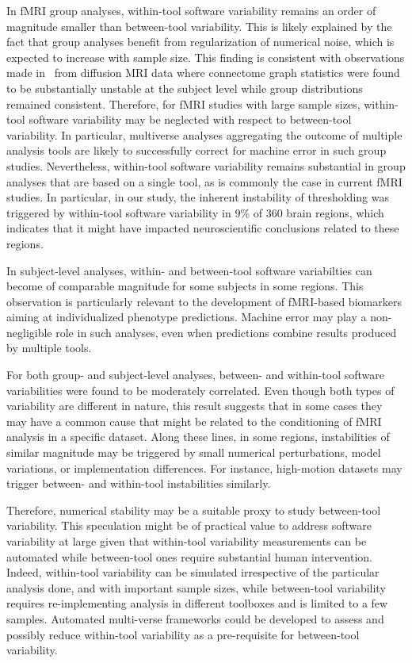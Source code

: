 \documentclass[11pt,onecolumn]{article}
\begin{document}
In fMRI group analyses, within-tool software variability remains an order
of magnitude smaller than between-tool variability. This is likely
explained by the fact that group analyses benefit from regularization of
numerical noise, which is expected to increase with sample size. This finding is
consistent with observations made in~\cite{kiar2020numerical} from
diffusion MRI data where connectome graph statistics were found to be
substantially unstable at the subject level while group distributions
remained consistent. Therefore,
for fMRI studies with large sample sizes, within-tool software variability
may be neglected with respect to between-tool variability. In particular,
multiverse analyses aggregating the outcome of multiple analysis tools are
likely to successfully correct for machine error in such group studies.  Nevertheless, within-tool software variability remains
substantial in group analyses that are based on a single tool, as is
commonly the case in current fMRI studies. In particular, in our study, the
inherent instability of thresholding was triggered by within-tool software
variability in 9\% of 360 brain regions, which indicates that it might have
impacted neuroscientific conclusions related to these regions.

In subject-level analyses, within- and between-tool software variabilties can become
of comparable magnitude for some subjects in some regions. This observation
is particularly relevant to the development of fMRI-based biomarkers aiming
at individualized phenotype predictions. Machine error may play
a non-negligible role in such analyses, even when predictions combine
results produced by multiple tools.

For both group- and subject-level analyses, between- and within-tool
software variabilities were found to be moderately correlated. Even though
both types of variability are different in nature, this result suggests
that in some cases they may have a common cause that might be related to
the conditioning of fMRI analysis in a specific dataset. Along these lines,
in some regions, instabilities of similar magnitude may be triggered by
small numerical perturbations, model variations, or implementation
differences. For instance, high-motion datasets may trigger between- and
within-tool instabilities similarly. 

Therefore, numerical stability may be a suitable proxy to study
between-tool variability. This speculation might be of practical value to
address software variability at large given that within-tool variability
measurements can be automated while between-tool ones require substantial
human intervention. Indeed, within-tool variability can be simulated
irrespective of the particular analysis done, and with important sample
sizes, while between-tool variability requires re-implementing analysis in
different toolboxes and is limited to a few samples. Automated multi-verse
frameworks could be developed to assess and possibly reduce within-tool
variability as a pre-requisite for between-tool variability.
\end{document}
